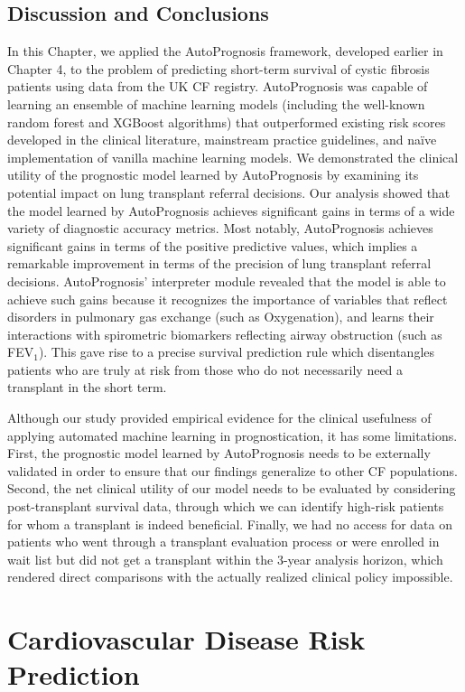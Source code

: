 \documentclass [PhD] {uclathes}
\begin{document}
\section{Discussion and Conclusions}
In this Chapter, we applied the AutoPrognosis framework, developed earlier in Chapter 4, to the problem of predicting short-term survival of cystic fibrosis patients using data from the UK CF registry. AutoPrognosis was capable of learning an ensemble of machine learning models (including the well-known random forest and XGBoost algorithms) that outperformed existing risk scores developed in the clinical literature, mainstream practice guidelines, and na\"ive implementation of vanilla machine learning models. We demonstrated the clinical utility of the prognostic model learned by AutoPrognosis by examining its potential impact on lung transplant referral decisions. Our analysis showed that the model learned by AutoPrognosis achieves significant gains in terms of a wide variety of diagnostic accuracy metrics. Most notably, AutoPrognosis achieves significant gains in terms of the positive predictive values, which implies a remarkable improvement in terms of the precision of lung transplant referral decisions. AutoPrognosis' interpreter module revealed that the model is able to achieve such gains because it recognizes the importance of variables that reflect disorders in pulmonary gas exchange (such as Oxygenation), and learns their interactions with spirometric biomarkers reflecting airway obstruction (such as FEV$_1$). This gave rise to a precise survival prediction rule which disentangles patients who are truly at risk from those who do not necessarily need a transplant in the short term.

Although our study provided empirical evidence for the clinical usefulness of applying automated machine learning in prognostication, it has some limitations. First, the prognostic model learned by AutoPrognosis needs to be externally validated in order to ensure that our findings generalize to other CF populations. Second, the net clinical utility of our model needs to be evaluated by considering post-transplant survival data, through which we can identify high-risk patients for whom a transplant is indeed beneficial. Finally, we had no access for data on patients who went through a transplant evaluation process or were enrolled in wait list but did not get a transplant within the 3-year analysis horizon, which rendered direct comparisons with the actually realized clinical policy impossible.


\chapter{Cardiovascular Disease Risk Prediction}
\end{document}
